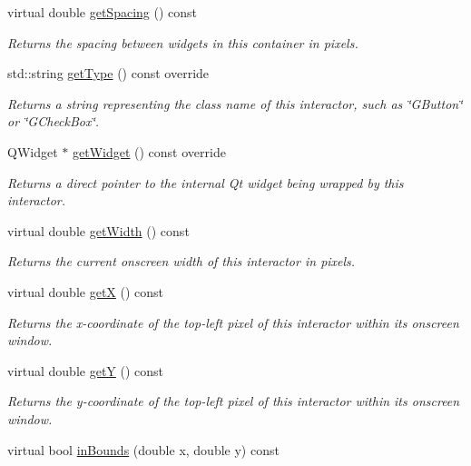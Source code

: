 \begin{DoxyCompactItemize}
virtual double \mbox{\hyperlink{classGContainer_a9a7e859eeff5cc7de46d65b9be7afc3c}{get\+Spacing}} () const
\begin{DoxyCompactList}\small\item\em Returns the spacing between widgets in this container in pixels. \end{DoxyCompactList}\item 
std\+::string \mbox{\hyperlink{classGContainer_a9b72ede4ee8520f987a0c01e30654814}{get\+Type}} () const override
\begin{DoxyCompactList}\small\item\em Returns a string representing the class name of this interactor, such as \char`\"{}\+G\+Button\char`\"{} or \char`\"{}\+G\+Check\+Box\char`\"{}. \end{DoxyCompactList}\item 
Q\+Widget $\ast$ \mbox{\hyperlink{classGContainer_a3b33a602b31a6b809d020535a59db3b4}{get\+Widget}} () const override
\begin{DoxyCompactList}\small\item\em Returns a direct pointer to the internal Qt widget being wrapped by this interactor. \end{DoxyCompactList}\item 
virtual double \mbox{\hyperlink{classGInteractor_a0ed2965abd4f5701d2cadf71239faf19}{get\+Width}} () const
\begin{DoxyCompactList}\small\item\em Returns the current onscreen width of this interactor in pixels. \end{DoxyCompactList}\item 
virtual double \mbox{\hyperlink{classGInteractor_a344385751bee0720059403940d57a13e}{getX}} () const
\begin{DoxyCompactList}\small\item\em Returns the x-\/coordinate of the top-\/left pixel of this interactor within its onscreen window. \end{DoxyCompactList}\item 
virtual double \mbox{\hyperlink{classGInteractor_aafa51c7f8f38a09febbb9ce7853f77b4}{getY}} () const
\begin{DoxyCompactList}\small\item\em Returns the y-\/coordinate of the top-\/left pixel of this interactor within its onscreen window. \end{DoxyCompactList}\item 
virtual bool \mbox{\hyperlink{classGInteractor_afc480f652b8c5f1fb255e2269ce68879}{in\+Bounds}} (double x, double y) const

\end{DoxyCompactItemize}
